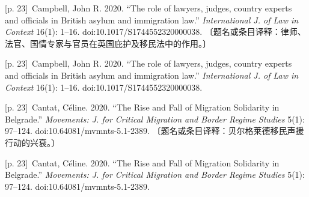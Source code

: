\documentclass[10pt,a4paper]{article}
\begin{document}
\noindent\begin{minipage}{\textwidth}\begin{minipage}[t]{\dimexpr.5\textwidth-4mm\relax}{\scriptsize\color{gray} [p. 23]}\ Campbell, John R. 2020. “The role of lawyers, judges, country experts and officials in British asylum and immigration law.” \textit{International J. of Law in Context} 16(1): 1–16. doi:10.1017/S1744552320000038. 〔题名或条目译释：律师、法官、国情专家与官员在英国庇护及移民法中的作用。〕\par\end{minipage}\hfill\begin{minipage}[t]{\dimexpr.5\textwidth-4mm\relax}{\scriptsize\color{gray} [p. 23]}\ Campbell, John R. 2020. “The role of lawyers, judges, country experts and officials in British asylum and immigration law.” \textit{International J. of Law in Context} 16(1): 1–16. doi:10.1017/S1744552320000038.\par\end{minipage}\end{minipage}\par
\noindent\begin{minipage}{\textwidth}\begin{minipage}[t]{\dimexpr.5\textwidth-4mm\relax}{\scriptsize\color{gray} [p. 23]}\ Cantat, Céline. 2020. “The Rise and Fall of Migration Solidarity in Belgrade.” \textit{Movements: J. for Critical Migration and Border Regime Studies} 5(1): 97–124. doi:10.64081/mvmnts-5.1-2389. 〔题名或条目译释：贝尔格莱德移民声援行动的兴衰。〕\par\end{minipage}\hfill\begin{minipage}[t]{\dimexpr.5\textwidth-4mm\relax}{\scriptsize\color{gray} [p. 23]}\ Cantat, Céline. 2020. “The Rise and Fall of Migration Solidarity in Belgrade.” \textit{Movements: J. for Critical Migration and Border Regime Studies} 5(1): 97–124. doi:10.64081/mvmnts-5.1-2389.\par\end{minipage}\end{minipage}\par
\end{document}
